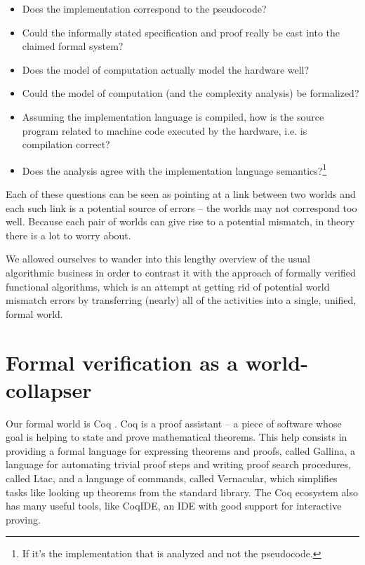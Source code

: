 \documentclass[declaration,mgr,english,shortabstract]{iithesis}
\begin{document}
\begin{itemize}
    \item Does the implementation correspond to the pseudocode?
    \item Could the informally stated specification and proof really be cast into the claimed formal system?
    \item Does the model of computation actually model the hardware well?
    \item Could the model of computation (and the complexity analysis) be formalized?
    \item Assuming the implementation language is compiled, how is the source program related to machine code executed by the hardware, i.e. is compilation correct?\item Does the analysis agree with the implementation language semantics?\footnote{If it's the implementation that is analyzed and not the pseudocode.}
\end{itemize}

Each of these questions can be seen as pointing at a link between two worlds and each such link is a potential source of errors -- the worlds may not correspond too well. Because each pair of worlds can give rise to a potential mismatch, in theory there is a lot to worry about.

We allowed ourselves to wander into this lengthy overview of the usual algorithmic business in order to contrast it with the approach of formally verified functional algorithms, which is an attempt at getting rid of potential world mismatch errors by transferring (nearly) all of the activities into a single, unified, formal world.

\section{Formal verification as a world-collapser} \label{formal}

Our formal world is Coq \cite{Coq}. Coq is a proof assistant -- a piece of software whose goal is helping to state and prove mathematical theorems. This help consists in providing a formal language for expressing theorems and proofs, called Gallina, a language for automating trivial proof steps and writing proof search procedures, called Ltac, and a language of commands, called Vernacular, which simplifies tasks like looking up theorems from the standard library. The Coq ecosystem also has many useful tools, like CoqIDE, an IDE with good support for interactive proving.
\end{document}
